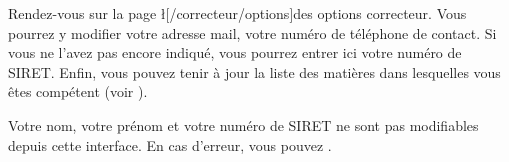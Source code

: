 ﻿Rendez-vous sur la page \l[/correcteur/options]{des options correcteur}.
Vous pourrez y modifier votre adresse mail, votre numéro de téléphone de contact.
Si vous ne l’avez pas encore indiqué, vous pourrez entrer ici votre numéro de SIRET.
Enfin, vous pouvez tenir à jour la liste des matières dans lesquelles vous êtes compétent (voir ).

Votre nom, votre prénom et votre numéro de SIRET ne sont pas modifiables depuis cette interface. En cas d’erreur, vous pouvez .
